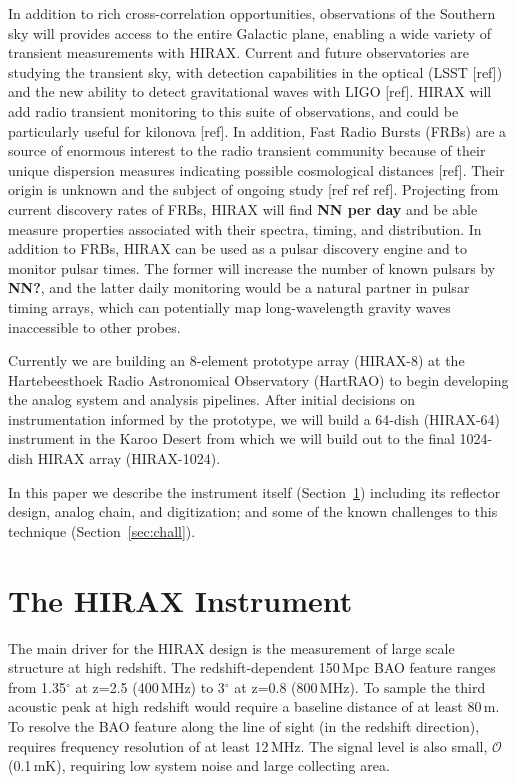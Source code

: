 \documentclass[]{spie}  %
\begin{document}
In addition to rich cross-correlation opportunities, observations of the Southern sky will provides access to the entire Galactic plane, enabling a wide variety of transient measurements with HIRAX. Current and future observatories are studying the transient sky, with detection capabilities in the optical (LSST [ref]) and the new ability to detect gravitational waves with LIGO [ref]. HIRAX will add radio transient monitoring to this suite of observations, and could be particularly useful for kilonova [ref]. In addition, Fast Radio Bursts (FRBs) are a source of enormous interest to the radio transient community because of their unique dispersion measures indicating possible cosmological distances [ref]. Their origin is unknown and the subject of ongoing study [ref ref ref]. Projecting from current discovery rates of FRBs, HIRAX will find \textbf{NN per day} and be able measure properties associated with their spectra, timing, and distribution. In addition to FRBs, HIRAX can be used as a pulsar discovery engine and to monitor pulsar times. The former will increase the number of known pulsars by \textbf{NN?}, and the latter daily monitoring would be a natural partner in pulsar timing arrays, which can potentially map long-wavelength gravity waves inaccessible to other probes. \newline 

Currently we are building an 8-element prototype array (HIRAX-8) at the Hartebeesthoek Radio Astronomical Observatory (HartRAO) to begin developing the analog system and analysis pipelines. After initial decisions on instrumentation informed by the prototype, we will build a 64-dish (HIRAX-64) instrument in the Karoo Desert from which we will build out to the final 1024-dish HIRAX array (HIRAX-1024). \newline

In this paper we describe the instrument itself (Section~\ref{sec:instru}) including its reflector design, analog chain, and digitization; and some of the known challenges to this technique (Section~\ref{sec:chall}).


\section{The HIRAX Instrument}
\label{sec:instru}

The main driver for the HIRAX design is the measurement of large scale structure at high redshift. The redshift-dependent 150\,Mpc BAO feature ranges from 1.35$^{\circ}$ at z=2.5 (400\,MHz) to 3$^{\circ}$ at z=0.8 (800\,MHz). To sample the third acoustic peak at high redshift would require a baseline distance of at least 80\,m. To resolve the BAO feature along the line of sight (in the redshift direction), requires frequency resolution of at least 12\,MHz. The signal level is also small, $\mathcal{O}$(0.1\,mK), requiring low system noise and large collecting area. \newline 
\end{document}
